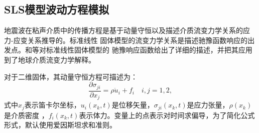 \vspace{0.3cm}
\subsection{SLS模型波动方程模拟}
\vspace{0.3cm}

地震波在粘声介质中的传播方程是基于动量守恒以及描述介质流变力学关系的应力-应变关系推导的。标准线性
固体模型的流变力学关系是描述驰豫函数响应的出发点。和等对标准线性固体模型的
驰豫响应函数给出了详细的描述，并把其应用到了地球介质流变力学解释。

对于二维固体，其动量守恒方程可描述为：
\begin{equation}
	\frac{\partial\sigma_{ji}}{\partial x_j}=\rho\ddot{u}_i+f_i \quad i,j=1,2,
	\label{eq:dl}
\end{equation}
式中$x_j$表示笛卡尔坐标，$u_i(x_k,t)$是位移矢量，$\sigma_{ji}(x_k,t)$是应力张量，$\rho(x_k)$是介质密度
，$f_i(x_k,t)$表示体力。变量上的点表示对时间求偏导，为了简化公式形式，默认使用爱因斯坦求和准则。

